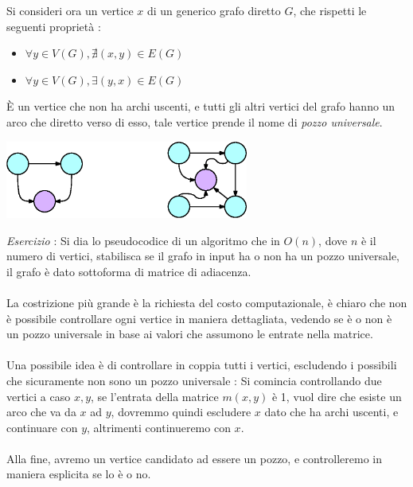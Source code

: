 \documentclass[12pt, letterpaper]{article}
\newcommand{\acc}{\\\hphantom{}\\}
\begin{document}
Si consideri ora un vertice $x$ di un generico grafo diretto $G$, che rispetti le seguenti proprietà : \begin{itemize}
    \item $\forall y\in V(G), \nexists (x,y)\in E(G)$
    \item $\forall y\in V(G), \exists (y,x)\in E(G)$
\end{itemize}
È un vertice che non ha archi uscenti, e tutti gli altri vertici del grafo hanno un arco che diretto verso di esso,
tale vertice prende il nome di \textit{pozzo universale}.\begin{center}
    \includegraphics[width=0.6\textwidth ]{images/pozzo.eps}
\end{center}
\textit{Esercizio} : Si dia lo pseudocodice di un algoritmo che in $O(n)$, dove $n$ è il numero di vertici,
stabilisca se il grafo in input ha o non ha un pozzo universale, il grafo è dato sottoforma di matrice di
adiacenza.\acc
La costrizione più grande è la richiesta del costo computazionale, è chiaro che non è possibile
controllare ogni vertice in maniera dettagliata, vedendo se è o non è un pozzo universale in base
ai valori che assumono le entrate nella matrice.\acc
Una possibile idea è di controllare in coppia tutti i vertici, escludendo i possibili che sicuramente non sono
un pozzo universale : Si comincia controllando due vertici a caso \(x,y\), se l'entrata della matrice
$m(x,y)$ è 1, vuol dire che esiste un arco che va da $x$ ad $y$, dovremmo quindi escludere $x$ dato che ha
archi uscenti, e continuare con $y$, altrimenti continueremo con $x$.\acc
Alla fine, avremo un vertice candidato ad essere un pozzo, e controlleremo in maniera esplicita se lo è o no.
\end{document}
